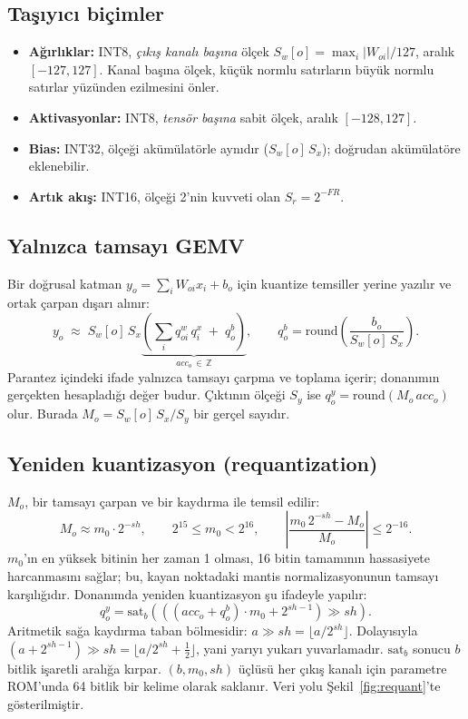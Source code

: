 \subsection{Taşıyıcı biçimler}
\begin{itemize}
  \item \textbf{Ağırlıklar:} INT8, \emph{çıkış kanalı başına} ölçek $S_w[o] = \max_i |W_{oi}|/127$, aralık $[-127, 127]$. Kanal başına ölçek, küçük normlu satırların büyük normlu satırlar yüzünden ezilmesini önler.
  \item \textbf{Aktivasyonlar:} INT8, \emph{tensör başına} sabit ölçek, aralık $[-128, 127]$.
  \item \textbf{Bias:} INT32, ölçeği akümülatörle aynıdır ($S_w[o]\,S_x$); doğrudan akümülatöre eklenebilir.
  \item \textbf{Artık akış:} INT16, ölçeği 2'nin kuvveti olan $S_r = 2^{-FR}$.
\end{itemize}

\subsection{Yalnızca tamsayı GEMV}
Bir doğrusal katman $y_o = \sum_i W_{oi} x_i + b_o$ için kuantize temsiller yerine yazılır ve ortak çarpan dışarı alınır:
\begin{equation}
  y_o \;\approx\; S_w[o]\, S_x \underbrace{\left( \sum_{i} q^{w}_{oi}\, q^{x}_{i} \;+\; q^{b}_{o} \right)}_{acc_o \,\in\, \mathbb{Z}}, \qquad q^{b}_{o} = \mathrm{round}\left( \frac{b_o}{S_w[o]\, S_x} \right).
\end{equation}
Parantez içindeki ifade yalnızca tamsayı çarpma ve toplama içerir; donanımın gerçekten hesapladığı değer budur. Çıktının ölçeği $S_y$ ise $q^y_o = \mathrm{round}(M_o\, acc_o)$ olur. Burada $M_o = S_w[o]\,S_x/S_y$ bir gerçel sayıdır.

\subsection{Yeniden kuantizasyon (requantization)}
$M_o$, bir tamsayı çarpan ve bir kaydırma ile temsil edilir:
\begin{equation}
  M_o \approx m_0 \cdot 2^{-sh}, \qquad 2^{15} \le m_0 < 2^{16}, \qquad \left| \frac{m_0\, 2^{-sh} - M_o}{M_o} \right| \le 2^{-16}.
\end{equation}
$m_0$'ın en yüksek bitinin her zaman 1 olması, 16 bitin tamamının hassasiyete harcanmasını sağlar; bu, kayan noktadaki mantis normalizasyonunun tamsayı karşılığıdır. Donanımda yeniden kuantizasyon şu ifadeyle yapılır:
\begin{equation}
  q^{y}_o = \mathrm{sat}_b\left( \left( (acc_o + q^b_o)\cdot m_0 + 2^{sh-1} \right) \gg sh \right).
\end{equation}
Aritmetik sağa kaydırma taban bölmesidir: $a \gg sh = \lfloor a/2^{sh}\rfloor$. Dolayısıyla $(a + 2^{sh-1}) \gg sh = \lfloor a/2^{sh} + \tfrac12\rfloor$, yani yarıyı yukarı yuvarlamadır. $\mathrm{sat}_b$ sonucu $b$ bitlik işaretli aralığa kırpar. $(b, m_0, sh)$ üçlüsü her çıkış kanalı için parametre ROM'unda 64 bitlik bir kelime olarak saklanır. Veri yolu Şekil~\ref{fig:requant}'te gösterilmiştir.

